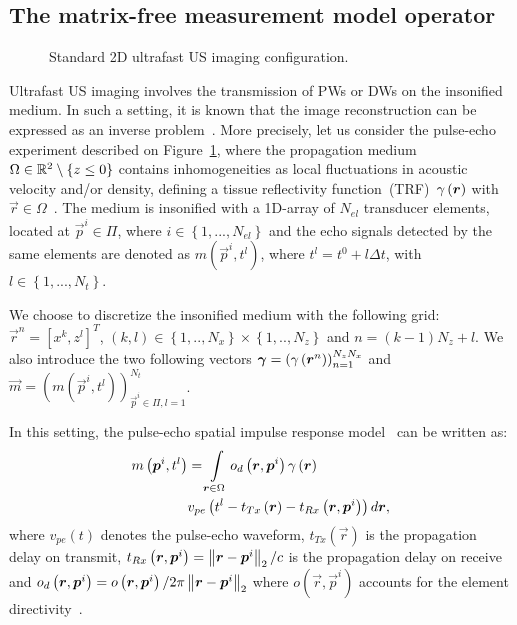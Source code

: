 \documentclass[conference]{IEEEtran}
\begin{document}
\subsection{The matrix-free measurement model operator}
\label{subsec_measurement_model}
\begin{figure}[htb]
	\centering
	
	\caption{Standard 2D ultrafast US imaging configuration.}
	\label{fig_pulse_echo}
\end{figure}
Ultrafast US imaging involves the transmission of PWs or DWs on the insonified medium. In such a setting, it is known that the image reconstruction can be expressed as an inverse problem~\cite{Schiffner_IUS_2012, David_JASA_2015}. More precisely, let us consider the pulse-echo experiment described on Figure~\ref{fig_pulse_echo}, where the propagation medium $\Omega \in \mathbb{R}^2 \setminus \left\lbrace z \leq 0\right\rbrace$ contains inhomogeneities as local fluctuations in acoustic velocity and/or density, defining a tissue reflectivity function~(TRF)~$\gamma\left(\bm{r}\right)$ with $\vec{r} \in \Omega$~\cite{Schiffner_IUS_2012,Michailovich_TMI_2005}. The medium is insonified with a \num{1}D-array of $N_{el}$ transducer elements, located at $\vec{p}^i \in \Pi$, where $i \in \left\lbrace 1,...,N_{el} \right\rbrace$ and the echo signals detected by the same elements are denoted as $m\left(\vec{p}^i, t^l\right)$, where $t^l = t^0 + l \Delta t$, with $l \in \left\lbrace 1,...,N_t \right\rbrace$.

We choose to discretize the insonified medium with the following grid: $\vec{r}^n = [x^k, z^l]^T$, $\left(k, l\right) \in \left\lbrace 1,..,N_x\right\rbrace \times \left\lbrace 1,..,N_z\right\rbrace$ and $n=(k-1)N_z + l$. We also introduce the two following vectors $\bm{\gamma} = \left(\gamma \left(\bm{r}^n\right)\right)_{n=1}^{N_z N_x}$ and $\vec{m}=\left(m \left(\vec{p}^i, t^l\right)\right)_{\vec{p}^i \in \Pi, l=1}^{N_t}$.

In this setting, the pulse-echo spatial impulse response model~\cite{Tupholme1969, Stepanishen1971} can be written as:
\begin{align}
\label{eq_rawdata}
m\left(\bm{p}^i, t^l\right) & = \int \limits_{\bm{r} \in \Omega} o_d \left(\bm{r}, \bm{p}^i\right) \gamma \left(\bm{r}\right) \nonumber \\ & v_{pe} \left(t^l - t_{Tx} \left(\bm{r}\right) - t_{Rx} \left( \bm{r}, \bm{p}^i \right) \right)  d\bm{r},
\end{align} 
where $v_{pe}\left(t\right)$ denotes the pulse-echo waveform, $t_{Tx} \left(\vec{r}\right)$ is the propagation delay on transmit, $t_{Rx} \left( \bm{r}, \bm{p}^i  \right) = \left\lVert\bm{r} - \bm{p}^i\right\rVert_{2} / c$ is the propagation delay on receive and $o_d \left(\bm{r}, \bm{p}^i\right) = o \left(\bm{r}, \bm{p}^i\right) / 2 \pi \left\lVert\bm{r} - \bm{p}^i\right\rVert_{2}$ where $o \left(\vec{r}, \vec{p}^i\right)$ accounts for the element directivity~\cite{Selfridge1980}.
\end{document}
